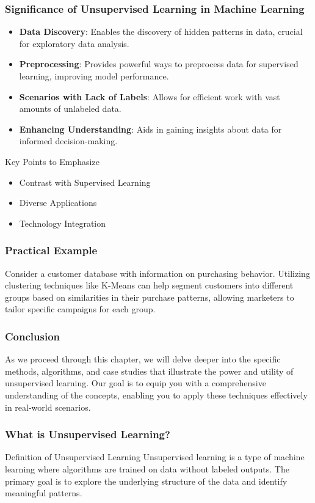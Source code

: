 \documentclass{beamer}
\begin{document}
\begin{frame}[fragile]
    \frametitle{Significance of Unsupervised Learning in Machine Learning}
    \begin{itemize}
        \item \textbf{Data Discovery}: Enables the discovery of hidden patterns in data, crucial for exploratory data analysis.
        \item \textbf{Preprocessing}: Provides powerful ways to preprocess data for supervised learning, improving model performance.
        \item \textbf{Scenarios with Lack of Labels}: Allows for efficient work with vast amounts of unlabeled data.
        \item \textbf{Enhancing Understanding}: Aids in gaining insights about data for informed decision-making.
    \end{itemize}

    \begin{block}{Key Points to Emphasize}
        \begin{itemize}
            \item Contrast with Supervised Learning
            \item Diverse Applications
            \item Technology Integration
        \end{itemize}
    \end{block}
\end{frame}

\begin{frame}[fragile]
    \frametitle{Practical Example}
    Consider a customer database with information on purchasing behavior. Utilizing clustering techniques like K-Means can help segment customers into different groups based on similarities in their purchase patterns, allowing marketers to tailor specific campaigns for each group.
\end{frame}

\begin{frame}[fragile]
    \frametitle{Conclusion}
    As we proceed through this chapter, we will delve deeper into the specific methods, algorithms, and case studies that illustrate the power and utility of unsupervised learning. Our goal is to equip you with a comprehensive understanding of the concepts, enabling you to apply these techniques effectively in real-world scenarios.
\end{frame}

\begin{frame}[fragile]
    \frametitle{What is Unsupervised Learning?}
    \begin{block}{Definition of Unsupervised Learning}
        Unsupervised learning is a type of machine learning where algorithms are trained on data without labeled outputs. The primary goal is to explore the underlying structure of the data and identify meaningful patterns.
    \end{block}
\end{frame}
\end{document}
